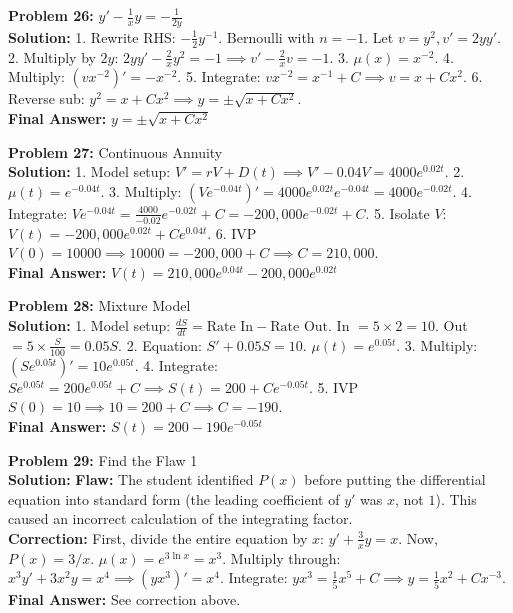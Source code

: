 \documentclass[11pt]{article}
\begin{document}
\vspace{10pt}
\textbf{Problem 26:} $y' - \frac{1}{x}y = -\frac{1}{2y}$ \\
\textbf{Solution:} 
1. Rewrite RHS: $-\frac{1}{2}y^{-1}$. Bernoulli with $n=-1$. Let $v = y^2, v' = 2yy'$. 
2. Multiply by $2y$: $2yy' - \frac{2}{x}y^2 = -1 \implies v' - \frac{2}{x}v = -1$. 
3. $\mu(x) = x^{-2}$. 
4. Multiply: $(v x^{-2})' = -x^{-2}$. 
5. Integrate: $v x^{-2} = x^{-1} + C \implies v = x + Cx^2$. 
6. Reverse sub: $y^2 = x + Cx^2 \implies y = \pm\sqrt{x + Cx^2}$. \\
\textbf{Final Answer:} $y = \pm\sqrt{x + Cx^2}$

\vspace{10pt}
\textbf{Problem 27:} Continuous Annuity \\
\textbf{Solution:} 
1. Model setup: $V' = rV + D(t) \implies V' - 0.04V = 4000e^{0.02t}$. 
2. $\mu(t) = e^{-0.04t}$. 
3. Multiply: $(Ve^{-0.04t})' = 4000e^{0.02t}e^{-0.04t} = 4000e^{-0.02t}$. 
4. Integrate: $Ve^{-0.04t} = \frac{4000}{-0.02}e^{-0.02t} + C = -200,000e^{-0.02t} + C$. 
5. Isolate $V$: $V(t) = -200,000e^{0.02t} + Ce^{0.04t}$. 
6. IVP $V(0) = 10000 \implies 10000 = -200,000 + C \implies C = 210,000$. \\
\textbf{Final Answer:} $V(t) = 210,000e^{0.04t} - 200,000e^{0.02t}$

\vspace{10pt}
\textbf{Problem 28:} Mixture Model \\
\textbf{Solution:} 
1. Model setup: $\frac{dS}{dt} = \text{Rate In} - \text{Rate Out}$. In $= 5 \times 2 = 10$. Out $= 5 \times \frac{S}{100} = 0.05S$. 
2. Equation: $S' + 0.05S = 10$. $\mu(t) = e^{0.05t}$. 
3. Multiply: $(S e^{0.05t})' = 10e^{0.05t}$. 
4. Integrate: $S e^{0.05t} = 200e^{0.05t} + C \implies S(t) = 200 + Ce^{-0.05t}$. 
5. IVP $S(0) = 10 \implies 10 = 200 + C \implies C = -190$. \\
\textbf{Final Answer:} $S(t) = 200 - 190e^{-0.05t}$

\vspace{10pt}
\textbf{Problem 29:} Find the Flaw 1 \\
\textbf{Solution:} 
\textbf{Flaw:} The student identified $P(x)$ before putting the differential equation into standard form (the leading coefficient of $y'$ was $x$, not $1$). This caused an incorrect calculation of the integrating factor. \\
\textbf{Correction:} First, divide the entire equation by $x$: $y' + \frac{3}{x}y = x$. Now, $P(x) = 3/x$. $\mu(x) = e^{3\ln x} = x^3$. Multiply through: $x^3 y' + 3x^2 y = x^4 \implies (yx^3)' = x^4$. Integrate: $y x^3 = \frac{1}{5}x^5 + C \implies y = \frac{1}{5}x^2 + Cx^{-3}$. \\
\textbf{Final Answer:} See correction above.
\end{document}
